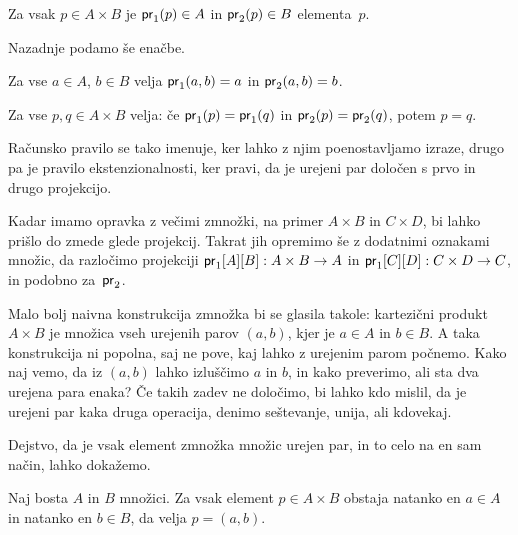 \begin{pravilo}
  \label{pravilo:zmnozek-uporaba}
  Za vsak $p \in A \times B$ je $\mathsf{pr}_1(p) \in A$  in $\mathsf{pr}_2(p) \in B$
   elementa~$p$.
\end{pravilo}

Nazadnje podamo še enačbe.

\begin{pravilo}
  \label{pravilo:zmnozek-racunanje}
  Za vse $a \in A$, $b \in B$ velja $\mathsf{pr}_1(a, b) = a$ in $\mathsf{pr}_2(a, b) = b$.
\end{pravilo}

\begin{pravilo}
  \label{pravilo:zmnozek-ekstenzionalnost}
  Za vse $p, q \in A \times B$ velja: če $\mathsf{pr}_1(p) = \mathsf{pr}_1(q)$ in $\mathsf{pr}_2(p) = \mathsf{pr}_2(q)$,
  potem $p = q$.
\end{pravilo}

\noindent
%
Računsko pravilo se tako imenuje, ker lahko z njim poenostavljamo izraze, drugo pa je
pravilo ekstenzionalnosti, ker pravi, da je urejeni par določen s prvo in drugo projekcijo.

Kadar imamo opravka z večimi zmnožki, na primer $A \times B$ in $C \times D$, bi lahko
prišlo do zmede glede projekcij. Takrat jih opremimo še z dodatnimi oznakami množic, da
razločimo projekciji $\mathsf{pr}_1[A][B] : A \times B \to A$ in $\mathsf{pr}_1[C][D] : C \times D \to C$,
in podobno za~$\mathsf{pr}_2$.

Malo bolj naivna konstrukcija zmnožka bi se glasila takole: kartezični produkt
$A \times B$ je množica vseh urejenih parov $(a, b)$, kjer je $a \in A$ in $b \in B$. A
taka konstrukcija ni popolna, saj ne pove, kaj lahko z urejenim parom počnemo. Kako naj
vemo, da iz $(a, b)$ lahko izluščimo $a$ in $b$, in kako preverimo, ali sta dva urejena
para enaka? Če takih zadev ne določimo, bi lahko kdo mislil, da je urejeni par kaka druga
operacija, denimo seštevanje, unija, ali kdovekaj.

Dejstvo, da je vsak element zmnožka množic urejen par, in to celo na en sam način, lahko
dokažemo.

\begin{trditev}
  Naj bosta $A$ in $B$ množici. Za vsak element $p \in A \times B$ obstaja natanko en
  $a \in A$ in natanko en $b \in B$, da velja $p = (a, b)$.
\end{trditev}


